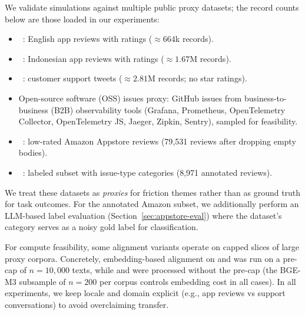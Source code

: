 We validate simulations against multiple public proxy datasets; the record counts below are those loaded in our experiments:
\begin{itemize}
  \item \DatasetTinder~\cite{kaggle_tinder}: English app reviews with ratings ($\approx 664$k records).
  \item \DatasetGojek~\cite{kaggle_gojek}: Indonesian app reviews with ratings ($\approx 1.67$M records).
  \item \DatasetTwitter~\cite{kaggle_twitter_support}: customer support tweets ($\approx 2.81$M records; no star ratings).
  \item Open-source software (OSS) issues proxy: GitHub issues from business-to-business (B2B) observability tools (Grafana, Prometheus, OpenTelemetry Collector, OpenTelemetry JS, Jaeger, Zipkin, Sentry), sampled for feasibility.
  \item \DatasetAmazon~\cite{amazonlowrated2026dataset}: low-rated Amazon Appstore reviews (79{,}531 reviews after dropping empty bodies).
  \item \DatasetAmazonAnn~\cite{amazonlowrated2026dataset}: labeled subset with issue-type categories (8{,}971 annotated reviews).
\end{itemize}

We treat these datasets as \emph{proxies} for friction themes rather than as ground truth for task outcomes.
For the annotated Amazon subset, we additionally perform an LLM-based label evaluation (Section~\ref{sec:appstore-eval}) where the dataset's category serves as a noisy gold label for classification.

For compute feasibility, some alignment variants operate on capped slices of large proxy corpora. Concretely, embedding-based alignment on \DatasetTinder{} and \DatasetGojek{} was run on a pre-cap of $n=10{,}000$ texts, while \DatasetTwitter{} and \DatasetAmazon{} were processed without the pre-cap (the BGE-M3 subsample of $n=200$ per corpus controls embedding cost in all cases).
In all experiments, we keep locale and domain explicit (e.g., app reviews vs support conversations) to avoid overclaiming transfer.
